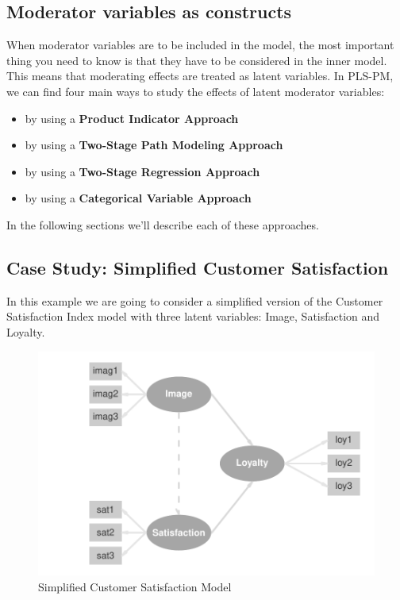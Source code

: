 \documentclass[12pt]{book}\usepackage{graphicx, color}
\newenvironment{knitrout}{}{} %
\begin{document}
\subsection{Moderator variables as constructs}
When moderator variables are to be included in the model, the most important thing you need to know is that they have to be considered in the inner model. This means that moderating effects are treated as latent variables. In PLS-PM, we can find four main ways to study the effects of latent moderator variables: 
\begin{itemize}
 \item by using a \textbf{Product Indicator Approach}
 \item by using a \textbf{Two-Stage Path Modeling Approach}
 \item by using a \textbf{Two-Stage Regression Approach}
 \item by using a \textbf{Categorical Variable Approach}
\end{itemize}
In the following sections we'll describe each of these approaches.



\subsection{Case Study: Simplified Customer Satisfaction}
In this example we are going to consider a simplified version of the Customer Satisfaction Index model with three latent variables: Image, Satisfaction and Loyalty. 



\begin{knitrout}
\color{fgcolor}\begin{figure}[h]


{\centering \includegraphics[width=.8\linewidth,height=.5\linewidth]{figure/simple_ecsi_diag} 

}

\caption[Simplified Customer Satisfaction Model]{Simplified Customer Satisfaction Model\label{fig:simple_ecsi_diag}}
\end{figure}


\end{knitrout}
\end{document}
